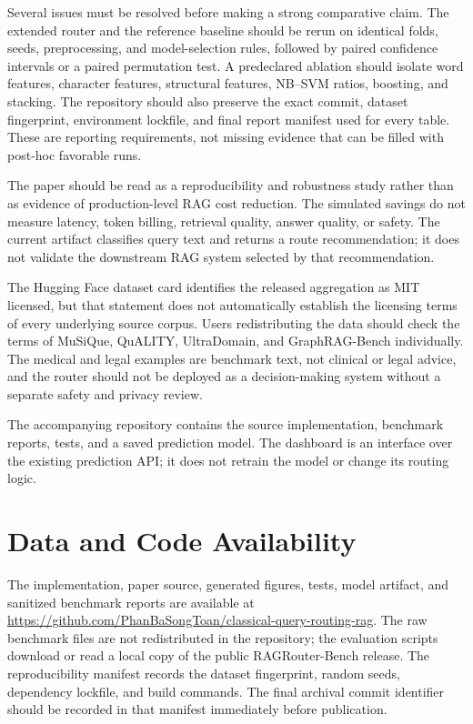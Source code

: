 \documentclass[conference]{IEEEtran}
\begin{document}
Several issues must be resolved before making a strong comparative claim. The extended router and the reference baseline should be rerun on identical folds, seeds, preprocessing, and model-selection rules, followed by paired confidence intervals or a paired permutation test. A predeclared ablation should isolate word features, character features, structural features, NB--SVM ratios, boosting, and stacking. The repository should also preserve the exact commit, dataset fingerprint, environment lockfile, and final report manifest used for every table. These are reporting requirements, not missing evidence that can be filled with post-hoc favorable runs.

The paper should be read as a reproducibility and robustness study rather than as evidence of production-level RAG cost reduction. The simulated savings do not measure latency, token billing, retrieval quality, answer quality, or safety. The current artifact classifies query text and returns a route recommendation; it does not validate the downstream RAG system selected by that recommendation.

The Hugging Face dataset card identifies the released aggregation as MIT
licensed, but that statement does not automatically establish the licensing
terms of every underlying source corpus. Users redistributing the data should
check the terms of MuSiQue, QuALITY, UltraDomain, and GraphRAG-Bench
individually. The medical and legal examples are benchmark text, not clinical
or legal advice, and the router should not be deployed as a decision-making
system without a separate safety and privacy review.

The accompanying repository contains the source implementation, benchmark reports, tests, and a saved prediction model. The dashboard is an interface over the existing prediction API; it does not retrain the model or change its routing logic.

\section*{Data and Code Availability}
The implementation, paper source, generated figures, tests, model artifact, and
sanitized benchmark reports are available at
\url{https://github.com/PhanBaSongToan/classical-query-routing-rag}. The raw benchmark
files are not redistributed in the repository; the evaluation scripts download
or read a local copy of the public RAGRouter-Bench release. The reproducibility
manifest records the dataset fingerprint, random seeds, dependency lockfile,
and build commands. The final archival commit identifier should be recorded in
that manifest immediately before publication.
\end{document}
